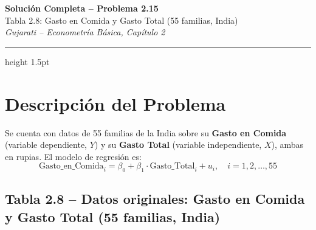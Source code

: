 \documentclass[12pt,a4paper]{article}
\begin{document}
\begin{center}
  {\LARGE \textbf{Solución Completa -- Problema 2.15}}\\[0.5em]
  {\large Tabla 2.8: Gasto en Comida y Gasto Total (55 familias, India)}\\[0.3em]
  {\normalsize \textit{Gujarati -- Econometría Básica, Capítulo 2}}
\end{center}
\hrule height 1.5pt
\vspace{1em}

\newpage

\section{Descripción del Problema}

Se cuenta con datos de 55 familias de la India sobre su \textbf{Gasto en Comida}
(variable dependiente, $Y$) y su \textbf{Gasto Total} (variable independiente, $X$),
ambas en rupias. El modelo de regresión es:
\[
  \text{Gasto\_en\_Comida}_i = \beta_0 + \beta_1 \cdot \text{Gasto\_Total}_i + u_i,
  \quad i = 1, 2, \ldots, 55
\]

\subsection*{Tabla 2.8 -- Datos originales: Gasto en Comida y Gasto Total (55 familias, India)}
\end{document}
